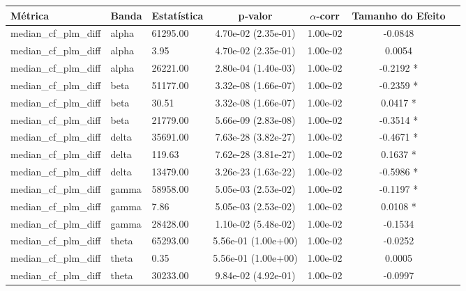 \begin{tabular}{l l l c c c c}
    \toprule
    Métrica & Banda & Estatística & p‑valor & $\alpha$‑corr & Tamanho do Efeito \\
    \midrule
    median\_cf\_plm\_diff & alpha & 61295.00 & 4.70e-02 (2.35e-01) & 1.00e-02 & -0.0848  \\
    median\_cf\_plm\_diff & alpha & 3.95 & 4.70e-02 (2.35e-01) & 1.00e-02 & 0.0054  \\
    median\_cf\_plm\_diff & alpha & 26221.00 & 2.80e-04 (1.40e-03) & 1.00e-02 & -0.2192 * \\
    median\_cf\_plm\_diff & beta & 51177.00 & 3.32e-08 (1.66e-07) & 1.00e-02 & -0.2359 * \\
    median\_cf\_plm\_diff & beta & 30.51 & 3.32e-08 (1.66e-07) & 1.00e-02 & 0.0417 * \\
    median\_cf\_plm\_diff & beta & 21779.00 & 5.66e-09 (2.83e-08) & 1.00e-02 & -0.3514 * \\
    median\_cf\_plm\_diff & delta & 35691.00 & 7.63e-28 (3.82e-27) & 1.00e-02 & -0.4671 * \\
    median\_cf\_plm\_diff & delta & 119.63 & 7.62e-28 (3.81e-27) & 1.00e-02 & 0.1637 * \\
    median\_cf\_plm\_diff & delta & 13479.00 & 3.26e-23 (1.63e-22) & 1.00e-02 & -0.5986 * \\
    median\_cf\_plm\_diff & gamma & 58958.00 & 5.05e-03 (2.53e-02) & 1.00e-02 & -0.1197 * \\
    median\_cf\_plm\_diff & gamma & 7.86 & 5.05e-03 (2.53e-02) & 1.00e-02 & 0.0108 * \\
    median\_cf\_plm\_diff & gamma & 28428.00 & 1.10e-02 (5.48e-02) & 1.00e-02 & -0.1534  \\
    median\_cf\_plm\_diff & theta & 65293.00 & 5.56e-01 (1.00e+00) & 1.00e-02 & -0.0252  \\
    median\_cf\_plm\_diff & theta & 0.35 & 5.56e-01 (1.00e+00) & 1.00e-02 & 0.0005  \\
    median\_cf\_plm\_diff & theta & 30233.00 & 9.84e-02 (4.92e-01) & 1.00e-02 & -0.0997  \\
    \bottomrule
\end{tabular}